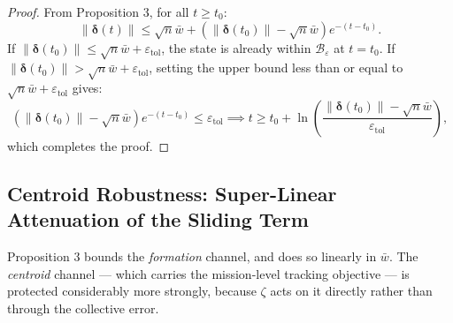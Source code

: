 \documentclass[11pt]{article}
\begin{document}
\begin{proof}
From Proposition 3, for all $t \ge t_0$:
\begin{equation}
\|\boldsymbol{\delta}(t)\| \le \sqrt{n}\bar{w} + \left( \|\boldsymbol{\delta}(t_0)\| - \sqrt{n}\bar{w} \right) e^{-(t - t_0)}.
\end{equation}
If $\|\boldsymbol{\delta}(t_0)\| \le \sqrt{n}\bar{w} + \varepsilon_{\text{tol}}$, the state is already within $\mathcal{B}_\varepsilon$ at $t = t_0$. If $\|\boldsymbol{\delta}(t_0)\| > \sqrt{n}\bar{w} + \varepsilon_{\text{tol}}$, setting the upper bound less than or equal to $\sqrt{n}\bar{w} + \varepsilon_{\text{tol}}$ gives:
\begin{equation}
\left( \|\boldsymbol{\delta}(t_0)\| - \sqrt{n}\bar{w} \right) e^{-(t - t_0)} \le \varepsilon_{\text{tol}} \implies t \ge t_0 + \ln\left(\frac{\|\boldsymbol{\delta}(t_0)\| - \sqrt{n}\bar{w}}{\varepsilon_{\text{tol}}}\right),
\end{equation}
which completes the proof.
\end{proof}

\subsection{Centroid Robustness: Super-Linear Attenuation of the Sliding Term}

Proposition 3 bounds the \emph{formation} channel, and does so linearly in $\bar{w}$. The \emph{centroid} channel --- which carries the mission-level tracking objective --- is protected considerably more strongly, because $\zeta$ acts on it directly rather than through the collective error.
\end{document}
